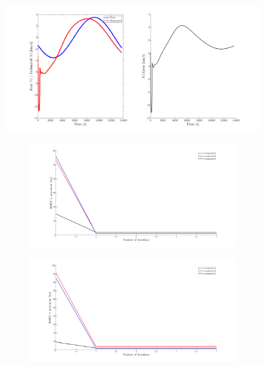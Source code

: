 \begin{figure}[H]
    \centering
    \includegraphics[width=\textwidth]{Figures/VZ_error--250km-1obs.png}
    \caption{}
    \label{fig: vzerror-250-1}
\end{figure}

\begin{figure}[H]
  \begin{subfigure}[b]{0.5\linewidth}
    \includegraphics[scale=0.3]{Figures/RMSEvsIterations.png}
    \caption{}
  \end{subfigure}
  \begin{subfigure}[b]{0.5\linewidth}
    \includegraphics[scale=0.3]{Figures/RMSEvsIterations-5observers-250km.png}
    \caption{}
  \end{subfigure}
  \caption{}
\label{fig: RMSE-5obs}
\end{figure}

